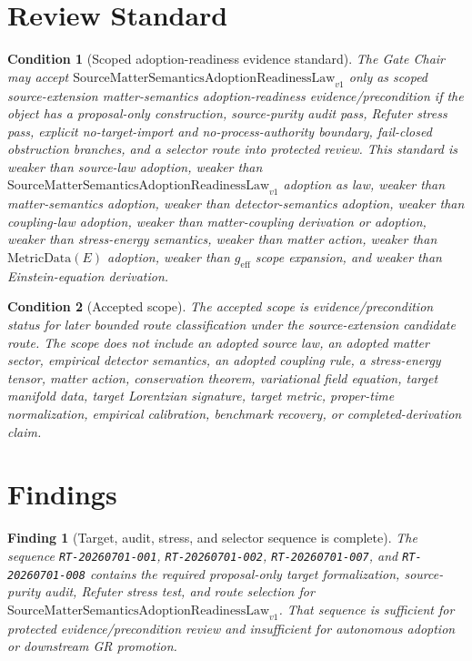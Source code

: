 \documentclass[11pt]{article}
\newcommand{\SMSAR}{\mathrm{SourceMatterSemanticsAdoptionReadinessLaw}_{v1}}
\newcommand{\MetricData}{\mathrm{MetricData}}
\newcommand{\geff}{g_{\mathrm{eff}}}
\newtheorem{finding}{Finding}
\newtheorem{condition}{Condition}
\begin{document}
\section{Review Standard}

\begin{condition}[Scoped adoption-readiness evidence standard]
The Gate Chair may accept \(\SMSAR\) only as scoped source-extension
matter-semantics adoption-readiness evidence/precondition if the object has a
proposal-only construction, source-purity audit pass, Refuter stress pass,
explicit no-target-import and no-process-authority boundary, fail-closed
obstruction branches, and a selector route into protected review. This
standard is weaker than source-law adoption, weaker than \(\SMSAR\) adoption
as law, weaker than matter-semantics adoption, weaker than detector-semantics
adoption, weaker than coupling-law adoption, weaker than matter-coupling
derivation or adoption, weaker than stress-energy semantics, weaker than
matter action, weaker than \(\MetricData(E)\) adoption, weaker than \(\geff\)
scope expansion, and weaker than Einstein-equation derivation.
\end{condition}

\begin{condition}[Accepted scope]
The accepted scope is evidence/precondition status for later bounded route
classification under the source-extension candidate route. The scope does not
include an adopted source law, an adopted matter sector, empirical detector
semantics, an adopted coupling rule, a stress-energy tensor, matter action,
conservation theorem, variational field equation, target manifold data,
target Lorentzian signature, target metric, proper-time normalization,
empirical calibration, benchmark recovery, or completed-derivation claim.
\end{condition}

\section{Findings}

\begin{finding}[Target, audit, stress, and selector sequence is complete]
The sequence \texttt{RT-20260701-001}, \texttt{RT-20260701-002},
\texttt{RT-20260701-007}, and \texttt{RT-20260701-008} contains the required
proposal-only target formalization, source-purity audit, Refuter stress test,
and route selection for \(\SMSAR\). That sequence is sufficient for
protected evidence/precondition review and insufficient for autonomous
adoption or downstream GR promotion.
\end{finding}
\end{document}
